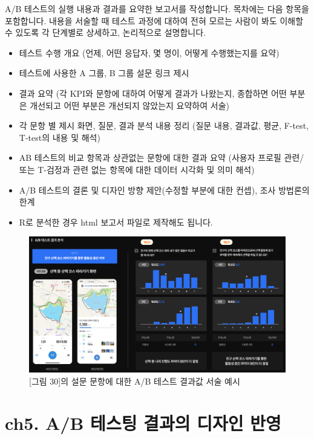 \documentclass[
  letterpaper,
]{book}
\providecommand{\tightlist}{%
  \setlength{\itemsep}{0pt}\setlength{\parskip}{0pt}}\usepackage{longtable,booktabs,array}
\begin{document}
A/B 테스트의 실행 내용과 결과를 요약한 보고서를 작성합니다. 목차에는
다음 항목을 포함합니다. 내용을 서술할 때 테스트 과정에 대하여 전혀
모르는 사람이 봐도 이해할 수 있도록 각 단계별로 상세하고, 논리적으로
설명합니다.

\begin{itemize}
\tightlist
\item
  테스트 수행 개요 (언제, 어떤 응답자, 몇 명이, 어떻게 수행했는지를
  요약)
\item
  테스트에 사용한 A 그룹, B 그룹 설문 링크 제시
\item
  결과 요약 (각 KPI와 문항에 대하여 어떻게 결과가 나왔는지, 종합하면
  어떤 부분은 개선되고 어떤 부분은 개선되지 않았는지 요약하여 서술)
\item
  각 문항 별 제시 화면, 질문, 결과 분석 내용 정리 (질문 내용, 결과값,
  평균, F-test, T-test의 내용 및 해석)
\item
  AB 테스트의 비교 항목과 상관없는 문항에 대한 결과 요약 (사용자 프로필
  관련/ 또는 T-검정과 관련 없는 항목에 대한 데이터 시각화 및 의미 해석)
\item
  A/B 테스트의 결론 및 디자인 방향 제안(수정할 부분에 대한 컨셉), 조사
  방법론의 한계
\item
  R로 분석한 경우 html 보고서 파일로 제작해도 됩니다.
\end{itemize}

\begin{figure}[H]

{\centering \includegraphics{img/fig31.png}

}

\caption{{[}그림 30{]}의 설문 문항에 대한 A/B 테스트 결과값 서술 예시}

\end{figure}%

\chapter{ch5. A/B 테스팅 결과의 디자인
반영}\label{ch5.-ab-uxd14cuxc2a4uxd305-uxacb0uxacfcuxc758-uxb514uxc790uxc778-uxbc18uxc601}
\end{document}
